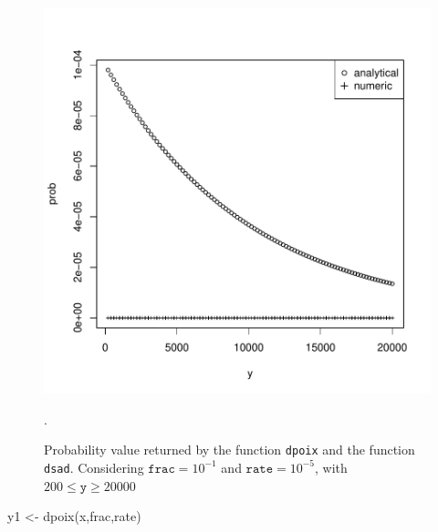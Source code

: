 \documentclass{article}
\newcommand{\code}[1]{\texttt{#1}}
\begin{document}
\begin{figure}[ht]
  \begin{center}
\includegraphics{sads_tutorial-007}
\end{center}
\caption{Probability value returned by the function \code{dpoix} and the function \code{dsad}. Considering $\code{frac}=10^{-1}$ and $\code{rate}=10^{-5}$, with $200 \leq \code{y} \geq 20000$}.
\label{fig:abs.tol}
\end{figure}

y1 <- dpoix(x,frac,rate)
\end{document}
